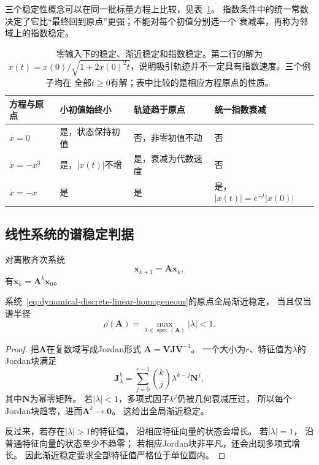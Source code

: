 三个稳定性概念可以在同一批标量方程上比较，见表~\ref{tab:dynamical-stability-types}。
指数条件中的统一常数决定了它比“最终回到原点”更强；不能对每个初值分别选一个
衰减率，再称为邻域上的指数稳定。

\begin{table}[htbp]
  \centering
  \begin{tabularx}{\linewidth}{lXXX}
    \toprule
    方程与原点 & 小初值始终小 & 轨迹趋于原点 & 统一指数衰减\\
    \midrule
    $\dot x=0$ & 是，状态保持初值 & 否，非零初值不动 & 否\\
    $\dot x=-x^3$ & 是，$|x(t)|$不增 & 是，衰减为代数速度 & 否\\
    $\dot x=-x$ & 是 & 是 & 是，$|x(t)|=e^{-t}|x(0)|$\\
    \bottomrule
  \end{tabularx}
  \caption{零输入下的稳定、渐近稳定和指数稳定。第二行的解为
  $x(t)=x(0)/\sqrt{1+2x(0)^2t}$，说明吸引轨迹并不一定具有指数速度。三个例子均在
  全部$t\geq0$有解；表中比较的是相应方程原点的性质。}
  \label{tab:dynamical-stability-types}
\end{table}

\subsection{线性系统的谱稳定判据}

对离散齐次系统
\begin{equation}
	\bm{x}_{k+1}=\bm{A}\bm{x}_{k}, \label{eq:dynamical-discrete-linear-homogeneous}
\end{equation}
有$\bm{x}_{k}=\bm{A}^{k}\bm{x}_{0}$。

\begin{theorem}[离散线性系统的渐近稳定性]
	\label{thm:dynamical-discrete-spectral-stability} 系统~\eqref{eq:dynamical-discrete-linear-homogeneous}的原点全局渐近稳定，
	当且仅当谱半径
	\[
		\rho(\bm{A}) = \max_{\lambda\in\operatorname{spec}(\bm{A})}|\lambda| <1.
	\]
\end{theorem}

\begin{proof}
	把$\bm{A}$在复数域写成Jordan形式 $\bm{A}=\bm{V}\bm{J}\bm{V}^{-1}$。 一个大小为$r$、特征值为$\lambda$的Jordan块满足
	\[
		\bm{J}_{\lambda}^{k}= \sum_{j=0}^{r-1}\binom{k}{j}\lambda^{k-j}\bm{N}^{j},
	\]
	其中$\bm{N}$为幂零矩阵。 若$|\lambda|<1$，多项式因子$k^{j}$仍被几何衰减压过，
	所以每个Jordan块趋零，进而$\bm{A}^{k}\to\bm{0}$。 这给出全局渐近稳定。

	反过来，若存在$|\lambda|>1$的特征值， 沿相应特征向量的状态会增长。 若$|\lambda|
	=1$， 沿普通特征向量的状态至少不趋零； 若相应Jordan块非平凡，还会出现多项式增长。
	因此渐近稳定要求全部特征值严格位于单位圆内。
\end{proof}


